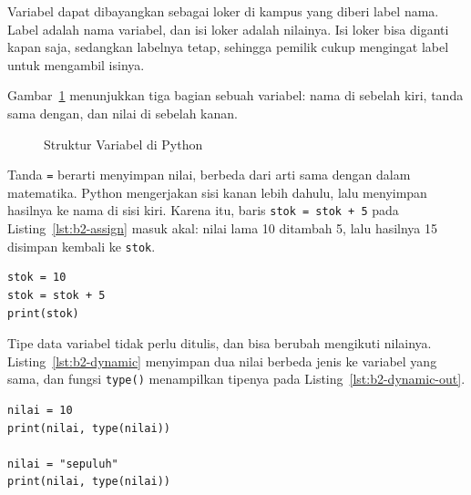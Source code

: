 Variabel dapat dibayangkan sebagai loker di kampus yang diberi label nama. Label adalah nama variabel, dan isi loker adalah nilainya. Isi loker bisa diganti kapan saja, sedangkan labelnya tetap, sehingga pemilik cukup mengingat label untuk mengambil isinya.

Gambar~\ref{fig:python-variable-structure} menunjukkan tiga bagian sebuah variabel: nama di sebelah kiri, tanda sama dengan, dan nilai di sebelah kanan.

\begin{figure}[H]
	\centering
	\caption{Struktur Variabel di Python}
	\label{fig:python-variable-structure}
\end{figure}

Tanda \texttt{=} berarti menyimpan nilai, berbeda dari arti sama dengan dalam matematika. Python mengerjakan sisi kanan lebih dahulu, lalu menyimpan hasilnya ke nama di sisi kiri. Karena itu, baris \texttt{stok = stok + 5} pada Listing~\ref{lst:b2-assign} masuk akal: nilai lama 10 ditambah 5, lalu hasilnya 15 disimpan kembali ke \texttt{stok}.

\begin{lstlisting}[style=PythonStyle, caption={Kode Python: tambah_stok.py}, label={lst:b2-assign}]
stok = 10
stok = stok + 5
print(stok)
\end{lstlisting}

Tipe data variabel tidak perlu ditulis, dan bisa berubah mengikuti nilainya. Listing~\ref{lst:b2-dynamic} menyimpan dua nilai berbeda jenis ke variabel yang sama, dan fungsi \texttt{type()} menampilkan tipenya pada Listing~\ref{lst:b2-dynamic-out}.

\begin{lstlisting}[style=PythonStyle, caption={Kode Python: tipe_dinamis.py}, label={lst:b2-dynamic}]
nilai = 10
print(nilai, type(nilai))

nilai = "sepuluh"
print(nilai, type(nilai))
\end{lstlisting}

